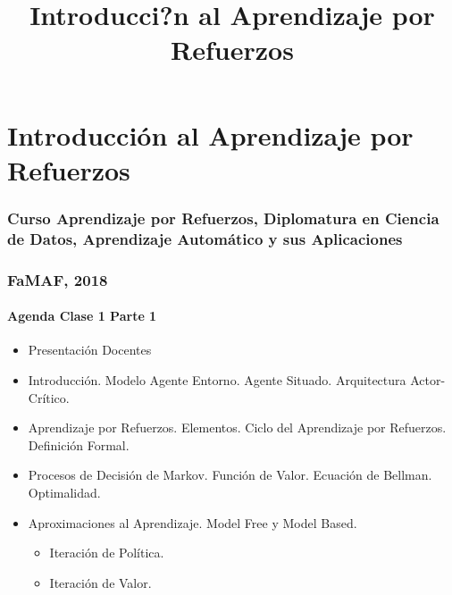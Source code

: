 \documentclass[11pt]{article}
\title{Introducci?n al Aprendizaje por Refuerzos}
\providecommand{\tightlist}{%
      \setlength{\itemsep}{0pt}\setlength{\parskip}{0pt}}
\begin{document}
    
    
    \maketitle
    
    

    
    \section{Introducción al Aprendizaje por
Refuerzos}\label{introducciuxf3n-al-aprendizaje-por-refuerzos}

\subsubsection{Curso Aprendizaje por Refuerzos, Diplomatura en Ciencia
de Datos, Aprendizaje Automático y sus
Aplicaciones}\label{curso-aprendizaje-por-refuerzos-diplomatura-en-ciencia-de-datos-aprendizaje-automuxe1tico-y-sus-aplicaciones}

\subsubsection{FaMAF, 2018}\label{famaf-2018}

\paragraph{Agenda Clase 1 Parte 1}\label{agenda-clase-1-parte-1}

\begin{itemize}
\tightlist
\item
  Presentación Docentes
\item
  Introducción. Modelo Agente Entorno. Agente Situado. Arquitectura
  Actor-Crítico.
\item
  Aprendizaje por Refuerzos. Elementos. Ciclo del Aprendizaje por
  Refuerzos. Definición Formal.
\item
  Procesos de Decisión de Markov. Función de Valor. Ecuación de Bellman.
  Optimalidad.
\item
  Aproximaciones al Aprendizaje. Model Free y Model Based.

  \begin{itemize}
  \tightlist
  \item
    Iteración de Política.
  \item
    Iteración de Valor.
  \end{itemize}
\end{itemize}
\end{document}
